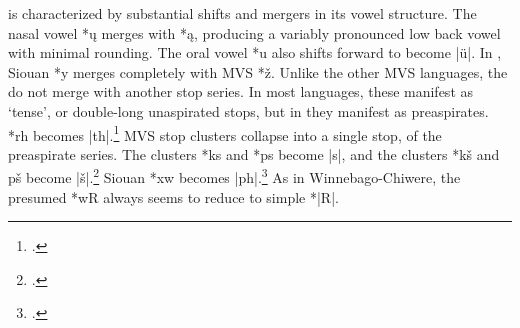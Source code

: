 \documentclass[output=paper]{LSP/langsci}
\begin{document}
 is characterized by substantial shifts and mergers in its vowel structure.  The nasal  vowel *\k{u} merges with *\k{a}, producing a variably pronounced low back vowel with minimal rounding.  The oral vowel *u also shifts forward to become |\"u|.  In , Siouan *y merges completely with MVS *\v{z}.  Unlike the other MVS languages, the  do not merge with another stop series.  In most  languages, these manifest as `tense', or double-long unaspirated stops, but in  they manifest as preaspirates.   *rh becomes |th|.\footnote{\citealt[165]{Rankinetal2006PDF}.} MVS stop clusters collapse into a single stop, of the preaspirate series.  The clusters *ks and *ps become |s|, and the clusters *kš and pš become |š|.\footnote{\citealt[64, 123, 222, 849]{Rankinetal2006PDF}.} Siouan *xw becomes |ph|.\footnote{\citealt[180]{Rankinetal2006PDF}.} As in Winnebago-Chiwere, the presumed  *wR always seems to reduce to simple *|R|.
\end{document}

